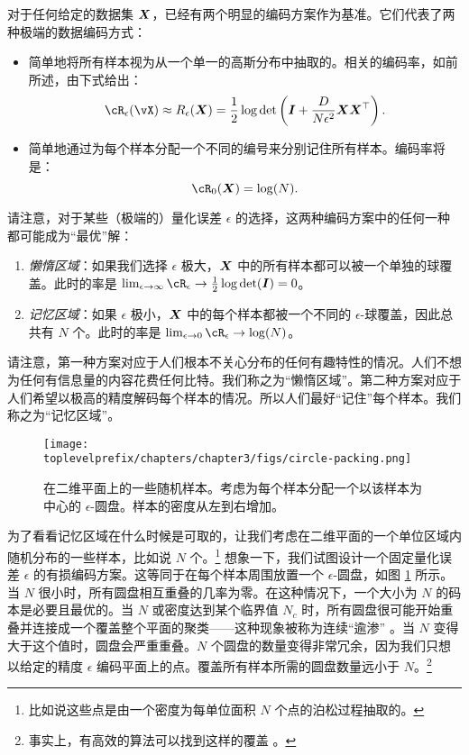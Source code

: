 \documentclass[../../book-main_zh.tex]{subfiles}
\begin{document}
对于任何给定的数据集 $\bm{X}$，已经有两个明显的编码方案作为基准。它们代表了两种极端的数据编码方式：
\begin{itemize}
	\item 简单地将所有样本视为从一个单一的高斯分布中抽取的。相关的编码率，如前所述，由下式给出：
	      \begin{equation}
		      \cR_{\epsilon}(\vX) \approx R_{\epsilon}(\X) = \frac{1}{2} \log \det \left(\boldsymbol{I} + \frac{D}{N\epsilon^2} \X\X^\top \right).
	      \end{equation}
	\item 简单地通过为每个样本分配一个不同的编号来分别记住所有样本。编码率将是：
	      \begin{equation}
		      \cR_0(\X) = \log(N).
	      \end{equation}
\end{itemize}


请注意，对于某些（极端的）量化误差 $\epsilon$ 的选择，这两种编码方案中的任何一种都可能成为“最优”解：
\begin{enumerate}
	\item {\em 懒惰区域}：如果我们选择 $\epsilon$ 极大，$\bm{X}$ 中的所有样本都可以被一个单独的球覆盖。此时的率是 $\lim_{\epsilon \rightarrow \infty} \cR_\epsilon \rightarrow \frac{1}{2}\log\det (\boldsymbol{I}) = 0$。
	\item {\em 记忆区域}：如果 $\epsilon$ 极小，$\bm{X}$ 中的每个样本都被一个不同的 $\epsilon$-球覆盖，因此总共有 $N$ 个。此时的率是 $\lim_{\epsilon \rightarrow 0} \cR_\epsilon \rightarrow \log(N)$。
\end{enumerate}
请注意，第一种方案对应于人们根本不关心分布的任何有趣特性的情况。人们不想为任何有信息量的内容花费任何比特。我们称之为“懒惰区域”。第二种方案对应于人们希望以极高的精度解码每个样本的情况。所以人们最好“记住”每个样本。我们称之为“记忆区域”。
\begin{figure}
	\centering
	\texttt{[image: \\toplevelprefix/chapters/chapter3/figs/circle-packing.png]}
	\caption{在二维平面上的一些随机样本。考虑为每个样本分配一个以该样本为中心的 $\epsilon$-圆盘。样本的密度从左到右增加。}
	\label{fig:circle-packing}
\end{figure}
\begin{example}
	为了看看记忆区域在什么时候是可取的，让我们考虑在二维平面的一个单位区域内随机分布的一些样本，比如说 $N$ 个。\footnote{比如说这些点是由一个密度为每单位面积 $N$ 个点的泊松过程抽取的。} 想象一下，我们试图设计一个固定量化误差 $\epsilon$ 的有损编码方案。这等同于在每个样本周围放置一个 $\epsilon$-圆盘，如图 \ref{fig:circle-packing} 所示。当 $N$ 很小时，所有圆盘相互重叠的几率为零。在这种情况下，一个大小为 $N$ 的码本是必要且最优的。当 $N$ 或密度达到某个临界值 $N_c$ 时，所有圆盘很可能开始重叠并连接成一个覆盖整个平面的聚类——这种现象被称为连续“逾渗” \cite{Gilbert-1961,Mertens-Moore-2012}。当 $N$ 变得大于这个值时，圆盘会严重重叠。$N$ 个圆盘的数量变得非常冗余，因为我们只想以给定的精度 $\epsilon$ 编码平面上的点。覆盖所有样本所需的圆盘数量远小于 $N$。\footnote{事实上，有高效的算法可以找到这样的覆盖 \cite{Booth-2001}。}
\end{example}
\end{document}
